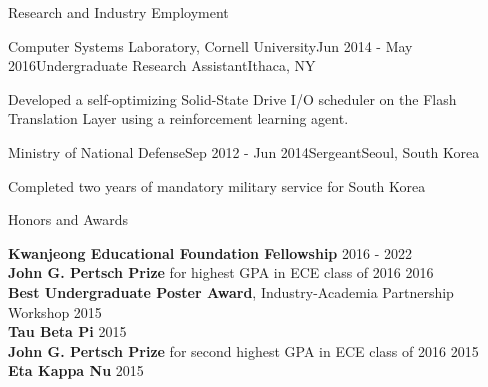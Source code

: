 \documentclass{resume} %
\begin{document}
\begin{rSection}{Research and Industry Employment}
\begin{rSubsection}{Computer Systems Laboratory, Cornell University}{Jun 2014 - May 2016}{Undergraduate Research Assistant}{Ithaca, NY}
\item Developed a self-optimizing Solid-State Drive I/O scheduler on the Flash Translation Layer using a reinforcement learning agent. 
\end{rSubsection}

\begin{rSubsection}{Ministry of National Defense}{Sep 2012 - Jun 2014}{Sergeant}{Seoul, South Korea}

\item Completed two years of mandatory military service for South Korea
\end{rSubsection}

\end{rSection}


\begin{rSection}{Honors and Awards}

{\bf Kwanjeong Educational Foundation Fellowship} \hfill {2016 - 2022} \\
{\bf John G. Pertsch Prize} for highest GPA in ECE class of 2016 \hfill{2016} \\
{\bf Best Undergraduate Poster Award}, Industry-Academia Partnership Workshop \hfill {2015} \\
{\bf Tau Beta Pi} \hfill {2015} \\
{\bf John G. Pertsch Prize} for second highest GPA in ECE class of 2016 \hfill {2015} \\
{\bf Eta Kappa Nu} \hfill {2015} 

\end{rSection}

\end{document}
